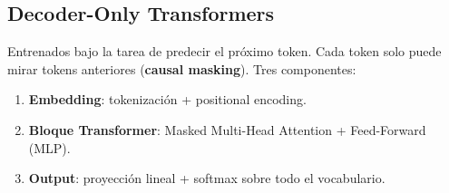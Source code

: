 \documentclass[12pt, a4paper]{article}
\begin{document}
\subsection{Decoder-Only Transformers}

Entrenados bajo la tarea de predecir el próximo token. Cada token solo puede mirar tokens anteriores (\textbf{causal masking}). Tres componentes:
\begin{enumerate}
	\item \textbf{Embedding}: tokenización + positional encoding.
	\item \textbf{Bloque Transformer}: Masked Multi-Head Attention + Feed-Forward (MLP).
	\item \textbf{Output}: proyección lineal + softmax sobre todo el vocabulario.
\end{enumerate}

\end{document}
